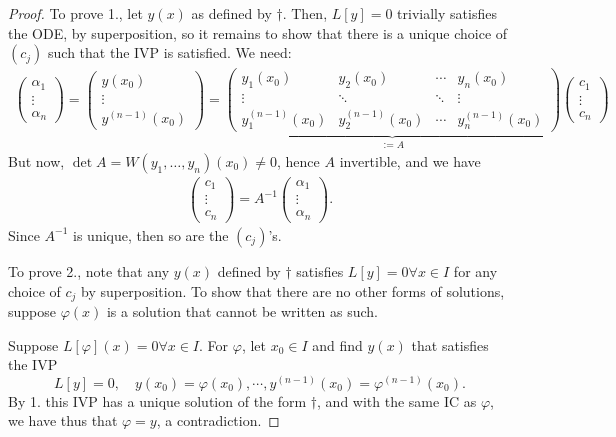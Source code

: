 \begin{proof}
    To prove 1., let $y(x)$ as defined by $\dagger$. Then, $L[y] = 0$ trivially satisfies the ODE, by superposition, so it remains to show that there is a unique choice of $(c_j)$ such that the IVP is satisfied. We need:
    \begin{align*}
        \begin{pmatrix}
        \alpha_1\\
        \vdots\\
        \alpha_n
    \end{pmatrix} =\begin{pmatrix}
        y(x_0)\\
        \vdots \\
        y^{(n-1)}(x_0)
    \end{pmatrix} = \underbrace{\begin{pmatrix}
        y_1(x_0) & y_2(x_0) & \cdots & y_n(x_0)\\
        \vdots & \ddots & \ddots & \vdots\\
        y_1^{(n-1)}(x_0) & y_2^{(n-1)}(x_0) & \cdots & y_n^{(n-1)}(x_0)
    \end{pmatrix}}_{:=A}\begin{pmatrix}
        c_1\\
        \vdots\\
        c_n
    \end{pmatrix}
    \end{align*}
    But now, $\det{A} = W(y_1, \dots, y_n)(x_0) \neq 0$, hence $A$ invertible, and we have \begin{align*}
        \begin{pmatrix}
            c_1\\
            \vdots\\
            c_n
        \end{pmatrix} = A^{-1} \begin{pmatrix}
            \alpha_1\\
            \vdots\\
            \alpha_n
        \end{pmatrix}.
    \end{align*}
    Since $A^{-1}$ is unique, then so are the $(c_j)$'s.

    To prove 2., note that any $y(x)$ defined by $\dagger$ satisfies $L[y] = 0 \forall x \in I$ for any choice of $c_j$ by superposition. To show that there are no other forms of solutions, suppose $\varphi(x)$ is a solution that cannot be written as such.

    Suppose $L[\varphi](x) = 0 \forall x \in I$. For $\varphi$, let $x_0\in I$ and find $y(x)$ that satisfies the IVP \[
    L[y] = 0, \quad y(x_0) = \varphi(x_0), \cdots, y^{(n-1)}(x_0) = \varphi^{(n-1)}(x_0).
    \]
    By 1. this IVP has a unique solution of the form $\dagger$, and with the same IC as $\varphi$, we have thus that $\varphi = y$, a contradiction.
\end{proof}

